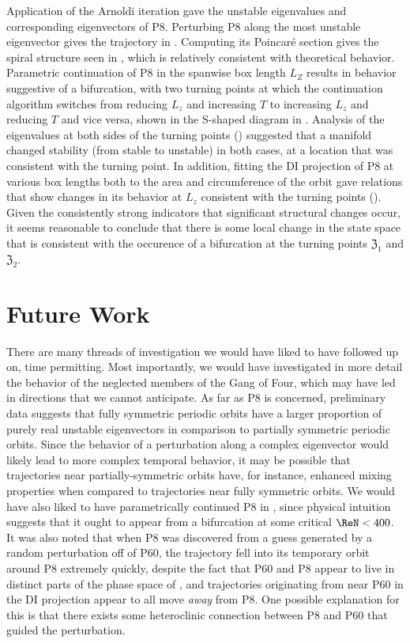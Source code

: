 Application of the Arnoldi iteration gave the unstable eigenvalues and corresponding eigenvectors of P8. Perturbing P8 along the most unstable eigenvector gives the trajectory in . Computing its Poincar\'e section gives the spiral structure seen in , which is relatively consistent with theoretical behavior. Parametric continuation of P8 in the spanwise box length $L_Z$ results in behavior suggestive of a bifurcation, with two turning points at which the continuation algorithm switches from reducing $L_z$ and increasing $T$ to increasing $L_z$ and reducing $T$ and vice versa, shown in the S-shaped diagram in . Analysis of the eigenvalues at both sides of the turning points () suggested that a manifold changed stability (from stable to unstable) in both cases, at a location that was consistent with the turning point.  In addition, fitting the DI projection of P8 at various box lengths both to the area and circumference of the orbit gave relations that show changes in its behavior at $L_z$ consistent with the turning points (). Given the consistently strong indicators that significant structural changes occur, it seems reasonable to conclude that there is some local change in the state space that is consistent with the occurence of a bifurcation at the turning points $\mathfrak{Z}_1$ and $\mathfrak{Z}_2$.\\


\section{Future Work}

There are many threads of investigation we would have liked to have followed up on, time permitting. Most importantly, we would have investigated in more detail the behavior of the neglected members of the Gang of Four, which may have led in directions that we cannot anticipate. As far as P8 is concerned, preliminary data suggests that fully symmetric periodic orbits have a larger proportion of purely real unstable eigenvectors in comparison to partially symmetric periodic orbits. Since the behavior of a perturbation along a complex eigenvector would likely lead to more complex temporal behavior, it may be possible that trajectories near partially-symmetric orbits have, for instance, enhanced mixing properties when compared to trajectories near fully symmetric orbits. We would have also liked to have parametrically continued P8 in \ReN, since physical intuition suggests that it ought to appear from a bifurcation at some critical $\ReN < 400$.  It was also noted that when P8 was discovered from a guess generated by a random perturbation off of P60, the trajectory fell into its temporary orbit around P8 extremely quickly, despite the fact that P60 and P8 appear to live in distinct parts of the phase space of , and trajectories originating from near P60 in the DI projection appear to all move \emph{away} from P8. One possible explanation for this is that there exists some heteroclinic connection between P8 and P60 that guided the perturbation.  